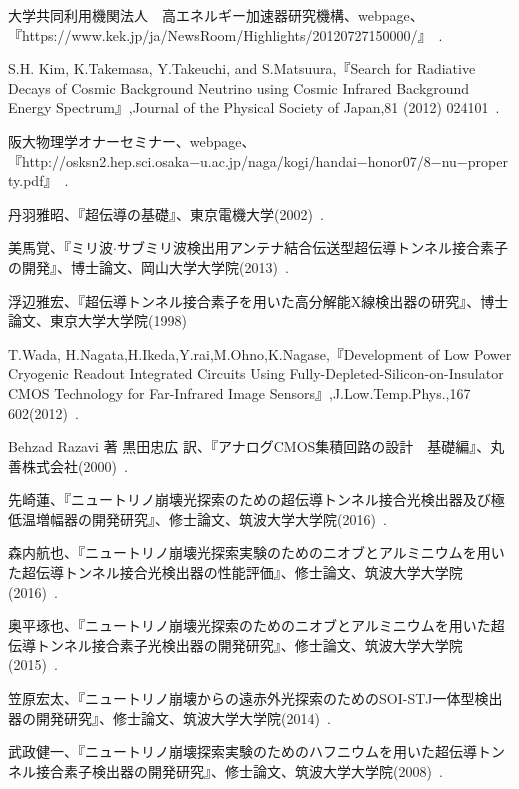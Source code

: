 \begin{thebibliography}{20}  %
  	 大学共同利用機関法人　高エネルギー加速器研究機構、webpage、『https://www.kek.jp/ja/NewsRoom/Highlights/20120727150000/』\ .
  	
  	 S.H. Kim, K.Takemasa, Y.Takeuchi, and S.Matsuura,『Search for Radiative Decays of Cosmic Background Neutrino using Cosmic Infrared Background Energy Spectrum』,Journal of the Physical Society of Japan,81 (2012) 024101\ .
	
	 阪大物理学オナーセミナー、webpage、『http://osksn2.hep.sci.osaka−u.ac.jp/naga/kogi/handai−honor07/8−nu−property.pdf』\ .
	
	 丹羽雅昭、『超伝導の基礎』、東京電機大学(2002)\ .
	
	 美馬覚、『ミリ波$\cdot$サブミリ波検出用アンテナ結合伝送型超伝導トンネル接合素子の開発』、博士論文、岡山大学大学院(2013)\ .
	
	 浮辺雅宏、『超伝導トンネル接合素子を用いた高分解能X線検出器の研究』、博士論文、東京大学大学院(1998)
	
	 T.Wada, H.Nagata,H.Ikeda,Y.rai,M.Ohno,K.Nagase,『Development of Low Power Cryogenic Readout Integrated Circuits Using Fully-Depleted-Silicon-on-Insulator CMOS Technology for Far-Infrared Image Sensors』,J.Low.Temp.Phys.,167 602(2012)\ .
	
	 Behzad Razavi 著  黒田忠広 訳、『アナログCMOS集積回路の設計　基礎編』、丸善株式会社(2000)\ .
	
	 先崎蓮、『ニュートリノ崩壊光探索のための超伝導トンネル接合光検出器及び極低温増幅器の開発研究』、修士論文、筑波大学大学院(2016)\ .
	
	 森内航也、『ニュートリノ崩壊光探索実験のためのニオブとアルミニウムを用いた超伝導トンネル接合光検出器の性能評価』、修士論文、筑波大学大学院(2016)\ .
	
	 奥平琢也、『ニュートリノ崩壊光探索のためのニオブとアルミニウムを用いた超伝導トンネル接合素子光検出器の開発研究』、修士論文、筑波大学大学院(2015)\ .
	
	 笠原宏太、『ニュートリノ崩壊からの遠赤外光探索のためのSOI-STJ一体型検出器の開発研究』、修士論文、筑波大学大学院(2014)\ .
	
	 武政健一、『ニュートリノ崩壊探索実験のためのハフニウムを用いた超伝導トンネル接合素子検出器の開発研究』、修士論文、筑波大学大学院(2008)\ .
\end{thebibliography}
